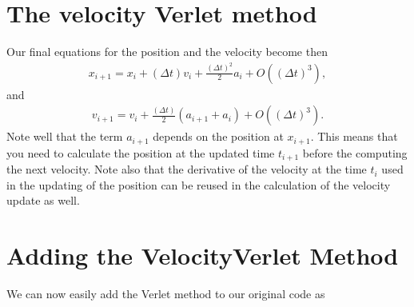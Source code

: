 \documentclass[letterpaper,10pt,english]{sphinxmanual}
\begin{document}
\section{The velocity Verlet method}
\label{\detokenize{chapter1:the-velocity-verlet-method}}
Our final equations for the position and the velocity become then
\begin{equation*}
\begin{split}
x_{i+1} = x_i+(\Delta t)v_i+\frac{(\Delta t)^2}{2}a_{i}+O((\Delta t)^3),
\end{split}
\end{equation*}
and
\begin{equation*}
\begin{split}
v_{i+1} = v_i+\frac{(\Delta t)}{2}\left(a_{i+1}+a_{i}\right)+O((\Delta t)^3).
\end{split}
\end{equation*}
Note well that the term \(a_{i+1}\) depends on the position at \(x_{i+1}\). This means that you need to calculate
the position at the updated time \(t_{i+1}\) before the computing the next velocity.  Note also that the derivative of the velocity at the time
\(t_i\) used in the updating of the position can be reused in the calculation of the velocity update as well.


\section{Adding the Velocity\sphinxhyphen{}Verlet Method}
\label{\detokenize{chapter1:adding-the-velocity-verlet-method}}
We can now easily add the Verlet method to our original code as
\end{document}

